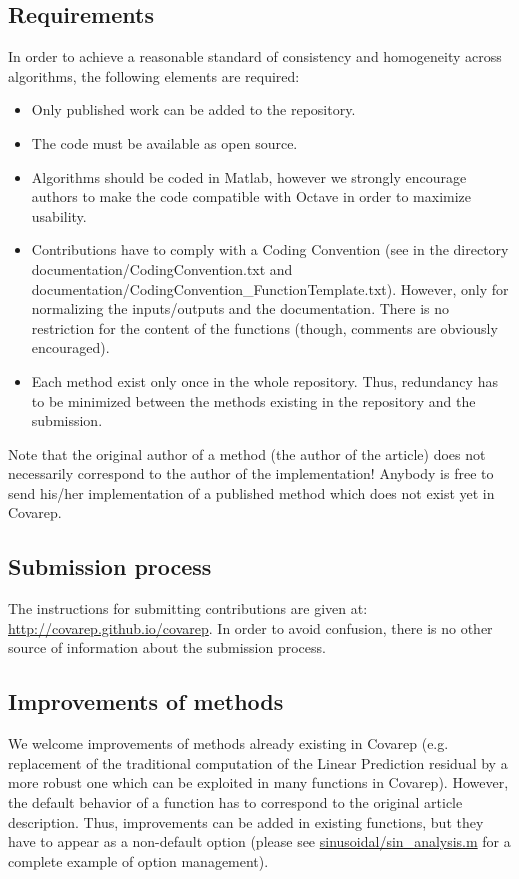 \documentclass{article}
\begin{document}
    \subsection{Requirements}
    In order to achieve a reasonable standard of consistency and homogeneity across algorithms, the following elements are required:
    \begin{itemize}
    \item Only published work can be added to the repository.
    \item The code must be available as open source.
    \item Algorithms should be coded in Matlab, however we strongly encourage authors to make the code compatible with Octave in order to maximize usability.

    \item Contributions have to comply with a Coding Convention (see in the directory \\ documentation/CodingConvention.txt and \\ documentation/CodingConvention\_FunctionTemplate.txt). However, only for normalizing the inputs/outputs and the documentation. There is no restriction for the content of the functions (though, comments are obviously encouraged).

    \item Each method exist only once in the whole repository. Thus, redundancy has to be minimized between the methods existing in the repository and the submission.
    \end{itemize}
    Note that the original author of a method (the author of the article) does not necessarily correspond to the author of the implementation! Anybody is free to send his/her implementation of a published method which does not exist yet in Covarep.

    \subsection{Submission process}
    The instructions for submitting contributions are given at:
    \url{http://covarep.github.io/covarep}.
	In order to avoid confusion, there is no other source of information about the submission process.

    \subsection{Improvements of methods}
    We welcome improvements of methods already existing in Covarep (e.g. replacement of the traditional computation of the Linear Prediction residual by a more robust one which can be exploited in many functions in Covarep).
    However, the default behavior of a function has to correspond to the original article description.
    Thus, improvements can be added in existing functions, but they have to appear as a non-default option (please see \url{sinusoidal/sin\_analysis.m} for a complete example of option management).
\end{document}
